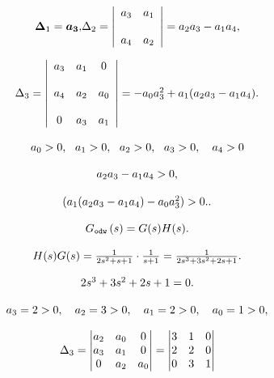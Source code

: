 \documentclass{article}
\begin{document}
\[
$$
\boldsymbol{\Delta}_{1}=\boldsymbol{a_{3}},
$$
$$
\Delta_{2}=\left| \begin{array} {c c} {a_{3}} & {a_{1}} \\ {} & {} \\ {a_{4}} & {a_{2}} \\ \end{array} \right|=a_{2} a_{3}-a_{1} a_{4},
$$
\]

\[
$$
\Delta_{3}=\left| \begin{array} {c c c} {a_{3}} & {a_{1}} & {0} \\ {} & {} & {} \\ {a_{4}} & {a_{2}} & {a_{0}} \\ {} & {} & {} \\ {0} & {a_{3}} & {a_{1}} \\ \end{array} \right|=-a_{0} a_{3}^{2}+a_{1} ( a_{2} a_{3}-a_{1} a_{4} ).
$$
\]

\[
$$
a_{0} > 0, \ \ a_{1} > 0, \ \ a_{2} > 0, \ \ a_{3} > 0, \ \ \ a_{4} > 0
$$
\]

\[
$$
a_{2} a_{3}-a_{1} a_{4} > 0,
$$
\]

\[
$$
( a_{1} ( a_{2} a_{3}-a_{1} a_{4} )-a_{0} a_{3}^{2} ) > 0.
$$
.
\]

\[
$$
G_{\tt o d w} \left( s \right)=G ( s ) H ( s ).
$$
\]

\[
$$
H ( s ) G ( s )=\frac{1} {2 s^{2}+s+1} \cdot\frac{1} {s+1}=\frac{1} {2 s^{3}+3 s^{2}+2 s+1}.
$$
\]

\[
$$
2 s^{3}+3 s^{2}+2 s+1=0.
$$
\]

\[
$$
a_{3}=2 > 0, \quad a_{2}=3 > 0, \quad a_{1}=2 > 0, \quad a_{0}=1 > 0,
$$
\]

\[
$$
\Delta_{3}=\left| \begin{matrix} {a_{2}} & {a_{0}} & {0} \\ {a_{3}} & {a_{1}} & {0} \\ {0} & {a_{2}} & {a_{0}} \\ \end{matrix} \right|=\left| \begin{matrix} {3} & {1} & {0} \\ {2} & {2} & {0} \\ {0} & {3} & {1} \\ \end{matrix} \right|
$$
\]
\end{document}
